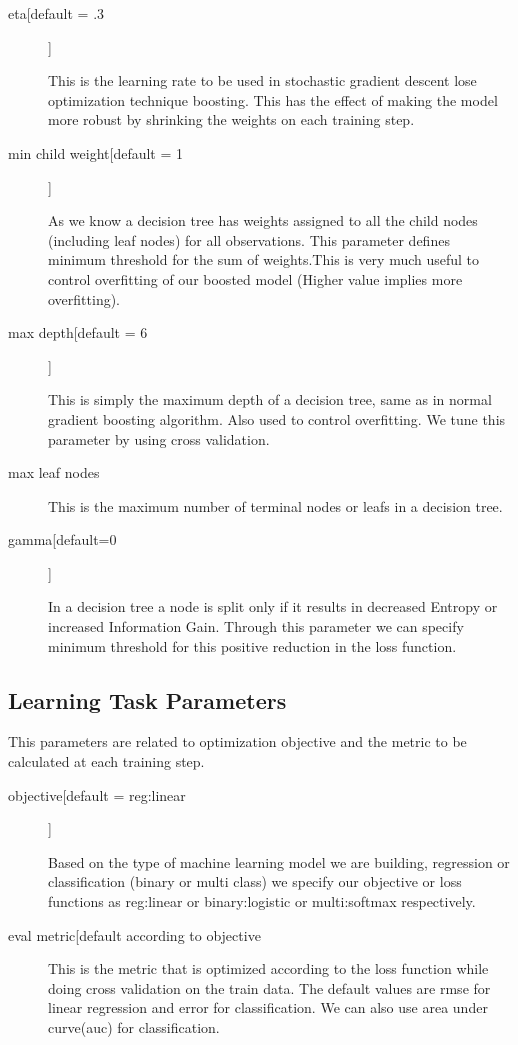 \begin{description}
\item[eta[default = .3]]

This is the learning rate to be used in stochastic gradient descent lose
optimization  technique boosting. This has the effect of making the model more
robust by shrinking the  weights on each training step.

\item[min child weight[default = 1]] 

As we know a decision tree has weights assigned to all the child nodes
(including leaf nodes) for all observations. This parameter defines minimum
threshold for the sum of  weights.This is very much useful to control
overfitting of our boosted model  (Higher  value implies more overfitting).

\item[max depth[default = 6]]

This is simply the maximum depth of a decision tree, same as in normal gradient
boosting  algorithm. Also used to control overfitting. We tune this parameter by
using cross validation.

\item[max leaf nodes]

This is the maximum number of terminal nodes or leafs in a decision tree.

\item[gamma[default=0]]

In a decision tree a node is split only if it results in decreased Entropy or
increased  Information Gain. Through this parameter  we can specify minimum
threshold for this positive  reduction in the loss function.

\end{description}

\subsection{Learning Task Parameters} 

This parameters are related to optimization objective and the metric to be
calculated at each training step.

\begin{description}

\item[objective[default = reg:linear]]

Based on the type of machine learning model we are building, regression or
classification (binary or multi class) we specify our objective or loss
functions as reg:linear or binary:logistic or  multi:softmax respectively.

\item[eval metric[default according to objective]

This is the metric that is optimized according to the loss function while doing
cross  validation on the train data. The default values are rmse for linear
regression and  error  for classification. We can also use area under curve(auc)
for classification.

\end{description}

